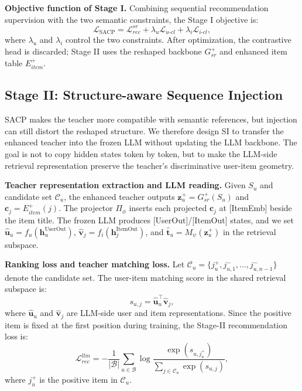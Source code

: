 ﻿\documentclass{article}
\begin{document}
\noindent\textbf{Objective function of Stage I.} Combining sequential recommendation supervision with the two semantic constraints, the Stage I objective is:
\begin{equation}
\mathcal{L}_{\text{SACP}}
=
\mathcal{L}_{rec}^{sr}
+\lambda_u \mathcal{L}_{u\text{-}cl}
+\lambda_i \mathcal{L}_{i\text{-}cl},
\end{equation}
where $\lambda_u$ and $\lambda_i$ control the two constraints. After optimization, the contrastive head is discarded; Stage II uses the reshaped backbone $G_{sr}^{+}$ and enhanced item table $E_{item}^{+}$.

\subsection{Stage II: Structure-aware Sequence Injection}

SACP makes the teacher more compatible with semantic references, but injection can still distort the reshaped structure. We therefore design SI to transfer the enhanced teacher into the frozen LLM without updating the LLM backbone. The goal is not to copy hidden states token by token, but to make the LLM-side retrieval representation preserve the teacher's discriminative user-item geometry.

\noindent\textbf{Teacher representation extraction and LLM reading.} Given $S_u$ and candidate set $\mathcal{C}_u$, the enhanced teacher outputs $\mathbf{z}_u^{+}=G_{sr}^{+}(S_u)$ and $\mathbf{c}_j=E_{item}^{+}(j)$. The projector $\Pi_{\phi}$ inserts each projected $\mathbf{c}_j$ at [ItemEmb] beside the item title. The frozen LLM produces [UserOut]/[ItemOut] states, and we set $\hat{\mathbf{u}}_u=f_u(\mathbf{h}_u^{\mathrm{UserOut}})$, $\hat{\mathbf{v}}_j=f_i(\mathbf{h}_j^{\mathrm{ItemOut}})$, and $\hat{\mathbf{t}}_u=M_{\psi}(\mathbf{z}_u^{+})$ in the retrieval subspace.

\noindent\textbf{Ranking loss and teacher matching loss.} Let $\mathcal{C}_u=\{j_u^{+},j_{u,1}^{-},\dots,j_{u,n-1}^{-}\}$ denote the candidate set. The user-item matching score in the shared retrieval subspace is:
\begin{equation}
s_{u,j}=\hat{\mathbf{u}}_u^{\top}\hat{\mathbf{v}}_j,
\label{eq:stage2_score}
\end{equation}
where $\hat{\mathbf{u}}_u$ and $\hat{\mathbf{v}}_j$ are LLM-side user and item representations.
Since the positive item is fixed at the first position during training, the Stage-II recommendation loss is:
\begin{equation}
\mathcal{L}_{rec}^{llm}
=-\frac{1}{|\mathcal{B}|}\sum_{u\in\mathcal{B}}
\log
\frac{\exp(s_{u,j_u^{+}})}
{\sum_{j\in\mathcal{C}_u}\exp(s_{u,j})},
\end{equation}
where $j_u^{+}$ is the positive item in $\mathcal{C}_u$.
\end{document}
